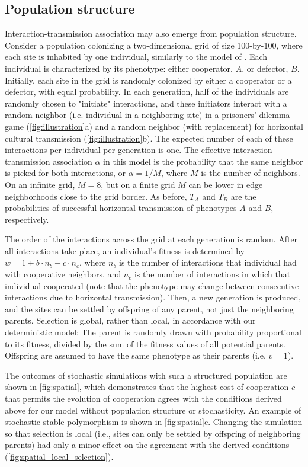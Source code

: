\documentclass[12pt]{extarticle}
\begin{document}
\subsection*{Population structure}
Interaction-transmission association may also emerge from population structure.
Consider a  population colonizing a two-dimensional grid of size 100-by-100, where each site is inhabited by one individual, similarly to the model of \citet{lewin2020rockpaperscissors}.
Each individual is characterized by its phenotype: either cooperator, $A$, or defector, $B$.
Initially, each site in the grid is randomly colonized by either a cooperator or a defector, with equal probability.
In each generation, half of the individuals are randomly chosen to "initiate" interactions, and these
initiators interact with a random neighbor (i.e. individual in a neighboring site) in a prisoners' dilemma game (\autoref{fig:illustration}a) and a random neighbor (with replacement) for horizontal cultural transmission (\autoref{fig:illustration}b).
The expected number of each of these interactions per individual per generation is one.
The effective interaction-transmission association $\alpha$ in this model is the probability that the same neighbor is picked for both interactions, or $\alpha=1/M$, where $M$ is the number of neighbors.
On an infinite grid, $M=8$, but on a finite grid $M$ can be lower in edge neighborhoods close to the grid border.
As before, $T_A$ and $T_B$ are the probabilities of successful horizontal transmission of phenotypes $A$ and $B$, respectively.

The order of the interactions across the grid at each generation is random.
After all interactions take place, an individual's fitness is determined by
$w = 1 + b \cdot n_b - c \cdot n_c$,
where $n_b$ is the number of interactions that individual had with cooperative neighbors,
and $n_c$ is the number of interactions in which that individual cooperated (note that the phenotype may change between consecutive interactions due to horizontal transmission).
Then, a new generation is produced, and the sites can be settled by offspring of any parent, not just the neighboring parents.
Selection is global, rather than local, in accordance with our deterministic model:
The parent is randomly drawn with probability proportional to its fitness, divided by the sum of the fitness values of all potential parents.
Offspring are assumed to have the same phenotype as their parents (i.e. $v=1$).

The outcomes of stochastic simulations with such a structured population are shown in \autoref{fig:spatial}, which demonstrates that the highest cost of cooperation $c$ that permits the evolution of cooperation agrees with the conditions derived above for our model without population structure or stochasticity.
An example of stochastic stable polymorphism is shown in \autoref{fig:spatial}c.
Changing the simulation so that selection is local (i.e., sites can only be settled by offspring of neighboring parents) had only a minor effect on the agreement with the derived conditions (\autoref{fig:spatial_local_selection}).
\end{document}
